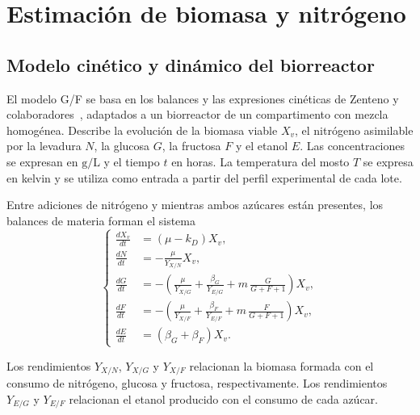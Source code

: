 \renewcommand{\tableshortname}{Tabla}
\chapter{Estimaci\'on de biomasa y nitr\'ogeno}
\label{cap:estimacion}

\section{Modelo cin\'etico y din\'amico del biorreactor}
\label{sec:modelo-biorreactor}

El modelo G/F se basa en los balances y las expresiones cin\'eticas
de Zenteno y colaboradores~\cite{zenteno2010}, adaptados a un
biorreactor de un compartimento con mezcla homog\'enea. Describe
la evoluci\'on de la biomasa viable \(X_v\), el nitr\'ogeno asimilable
por la levadura \(N\), la glucosa \(G\), la fructosa \(F\) y el
etanol \(E\). Las concentraciones se expresan en \(\mathrm{g/L}\)
y el tiempo \(t\) en horas. La temperatura del mosto \(T\) se
expresa en kelvin y se utiliza como entrada a partir del perfil
experimental de cada lote.

Entre adiciones de nitr\'ogeno y mientras ambos az\'ucares est\'an
presentes, los balances de materia forman el sistema
\begin{equation}
  \left\{
  \begin{aligned}
    \frac{dX_v}{dt} &= (\mu-k_D)X_v,\\[6pt]
    \frac{dN}{dt} &= -\frac{\mu}{Y_{X/N}}X_v,\\[6pt]
    \frac{dG}{dt} &=
      -\left(\frac{\mu}{Y_{X/G}}+\frac{\beta_G}{Y_{E/G}}
             +m\,\frac{G}{G+F+1}\right)X_v,\\[6pt]
    \frac{dF}{dt} &=
      -\left(\frac{\mu}{Y_{X/F}}+\frac{\beta_F}{Y_{E/F}}
             +m\,\frac{F}{G+F+1}\right)X_v,\\[6pt]
    \frac{dE}{dt} &= (\beta_G+\beta_F)X_v .
  \end{aligned}
  \right.
  \label{eq:c4-sistema-gf}
\end{equation}

Los rendimientos \(Y_{X/N}\), \(Y_{X/G}\) y \(Y_{X/F}\) relacionan
la biomasa formada con el consumo de nitr\'ogeno, glucosa y
fructosa, respectivamente. Los rendimientos \(Y_{E/G}\) y
\(Y_{E/F}\) relacionan el etanol producido con el consumo de cada
az\'ucar.

